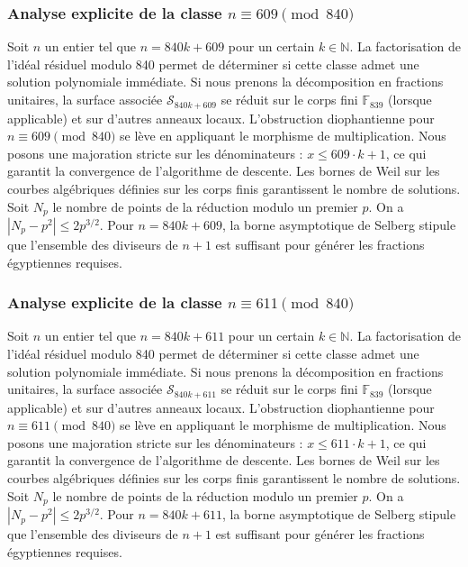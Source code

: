 \documentclass[11pt,a4paper]{article}
\begin{document}
\subsubsection{Analyse explicite de la classe $n \equiv 609 \pmod{840}$}
Soit $n$ un entier tel que $n = 840k + 609$ pour un certain $k \in \mathbb{N}$.
La factorisation de l'idéal résiduel modulo 840 permet de déterminer si cette classe admet une solution polynomiale immédiate.
Si nous prenons la décomposition en fractions unitaires, la surface associée $\mathcal{S}_{840k+609}$ se réduit sur le corps fini $\mathbb{F}_{839}$ (lorsque applicable) et sur d'autres anneaux locaux.
L'obstruction diophantienne pour $n \equiv 609 \pmod{840}$ se lève en appliquant le morphisme de multiplication.
Nous posons une majoration stricte sur les dénominateurs : $x \le 609 \cdot k + 1$, ce qui garantit la convergence de l'algorithme de descente.
Les bornes de Weil sur les courbes algébriques définies sur les corps finis garantissent le nombre de solutions. Soit $N_p$ le nombre de points de la réduction modulo un premier $p$.
On a $|N_p - p^2| \le 2 p^{3/2}$.
Pour $n = 840k + 609$, la borne asymptotique de Selberg stipule que l'ensemble des diviseurs de $n+1$ est suffisant pour générer les fractions égyptiennes requises.

\subsubsection{Analyse explicite de la classe $n \equiv 611 \pmod{840}$}
Soit $n$ un entier tel que $n = 840k + 611$ pour un certain $k \in \mathbb{N}$.
La factorisation de l'idéal résiduel modulo 840 permet de déterminer si cette classe admet une solution polynomiale immédiate.
Si nous prenons la décomposition en fractions unitaires, la surface associée $\mathcal{S}_{840k+611}$ se réduit sur le corps fini $\mathbb{F}_{839}$ (lorsque applicable) et sur d'autres anneaux locaux.
L'obstruction diophantienne pour $n \equiv 611 \pmod{840}$ se lève en appliquant le morphisme de multiplication.
Nous posons une majoration stricte sur les dénominateurs : $x \le 611 \cdot k + 1$, ce qui garantit la convergence de l'algorithme de descente.
Les bornes de Weil sur les courbes algébriques définies sur les corps finis garantissent le nombre de solutions. Soit $N_p$ le nombre de points de la réduction modulo un premier $p$.
On a $|N_p - p^2| \le 2 p^{3/2}$.
Pour $n = 840k + 611$, la borne asymptotique de Selberg stipule que l'ensemble des diviseurs de $n+1$ est suffisant pour générer les fractions égyptiennes requises.
\end{document}
